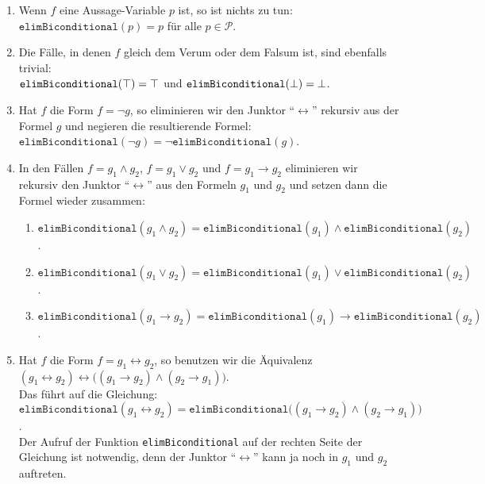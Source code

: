 \begin{enumerate}
\item Wenn $f$ eine
      Aussage-Variable $p$ ist, so ist nichts zu tun:
      \\[0.2cm]
      \hspace*{1.3cm}
      $\texttt{elimBiconditional}(p) = p$ \quad für alle $p \in \mathcal{P}$.
\item Die Fälle, in denen $f$ gleich dem Verum oder dem Falsum ist, sind ebenfalls trivial:
      \\[0.2cm]
      \hspace*{1.3cm}
      $\texttt{elimBiconditional}(\top) = \top$ \quad und \quad
      $\texttt{elimBiconditional}(\bot) = \bot$.
\item Hat $f$ die Form $f = \neg g$, so eliminieren wir den Junktor
      ``$\leftrightarrow$'' rekursiv aus der Formel $g$ und negieren die resultierende Formel: \\[0.2cm]
      \hspace*{1.3cm} 
      $\texttt{elimBiconditional}(\neg g) = \neg \texttt{elimBiconditional}(g)$.
\item In den Fällen $f = g_1 \wedge g_2$,  $f = g_1 \vee g_2$ und $f = g_1 \rightarrow g_2$ eliminieren wir
      rekursiv den Junktor ``$\leftrightarrow$'' aus den Formeln $g_1$ und $g_2$ und setzen dann die Formel
      wieder zusammen: 
      \begin{enumerate}
      \item $\texttt{elimBiconditional}(g_1 \wedge g_2) = \texttt{elimBiconditional}(g_1) \wedge \texttt{elimBiconditional}(g_2)$.
      \item $\texttt{elimBiconditional}(g_1 \vee g_2) = \texttt{elimBiconditional}(g_1) \vee \texttt{elimBiconditional}(g_2)$.
      \item $\texttt{elimBiconditional}(g_1 \rightarrow g_2) = \texttt{elimBiconditional}(g_1) \rightarrow \texttt{elimBiconditional}(g_2)$.
      \end{enumerate}
\item Hat $f$ die Form $f = g_1 \leftrightarrow g_2$, so benutzen wir die
      Äquivalenz \\[0.2cm]
      \hspace*{1.3cm} 
      $(g_1 \leftrightarrow g_2) \leftrightarrow \bigl( (g_1 \rightarrow g_2) \wedge (g_2 \rightarrow g_1)\bigr)$.
      \\[0.2cm]
      Das führt auf die Gleichung:
      \\[0.2cm]
      \hspace*{1.3cm} 
      $\texttt{elimBiconditional}(g_1 \leftrightarrow g_2) = \texttt{elimBiconditional}\bigl( (g_1 \rightarrow g_2) \wedge (g_2 \rightarrow g_1)\bigr)$. 
      \\[0.2cm]
      Der Aufruf der Funktion \texttt{elimBiconditional} auf der rechten Seite der Gleichung ist notwendig,
      denn der Junktor ``$\leftrightarrow$'' kann ja noch in $g_1$ und $g_2$ auftreten.
\end{enumerate}


